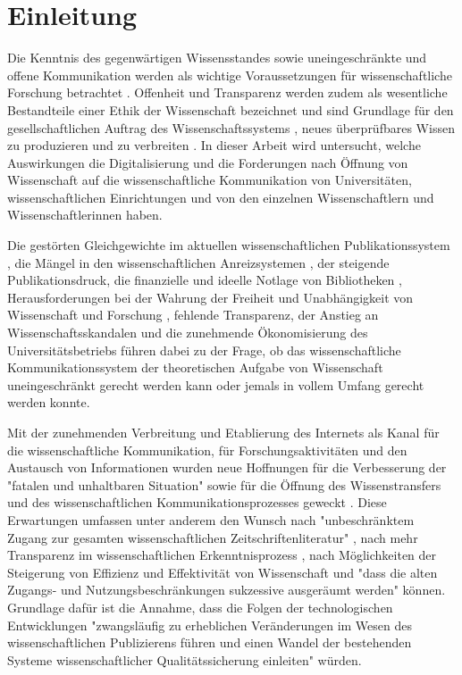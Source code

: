 \chapter{Einleitung}

Die Kenntnis des gegenwärtigen Wissensstandes sowie uneingeschränkte und offene Kommunikation werden als wichtige Voraussetzungen für wissenschaftliche Forschung betrachtet \cite{Glaeser_2006} \cite{Gibbons_1994}. Offenheit und Transparenz werden zudem als wesentliche Bestandteile einer Ethik der Wissenschaft bezeichnet \cite{Peters_2014} \cite{Resnik_2005} und sind Grundlage für den gesellschaftlichen Auftrag des Wissenschaftssystems \cite[:3]{Hanekop_2014}, neues überprüfbares Wissen zu produzieren und zu verbreiten \cite[:551]{Luescher_2014} \cite[:298]{Luhmann_1998} \cite[:100]{Graefen_2007}. In dieser Arbeit wird untersucht, welche Auswirkungen die Digitalisierung und die Forderungen nach Öffnung von Wissenschaft auf die wissenschaftliche Kommunikation von Universitäten, wissenschaftlichen Einrichtungen und von den einzelnen Wissenschaftlern und Wissenschaftlerinnen haben.

Die gestörten Gleichgewichte im aktuellen wissenschaftlichen Publikationssystem \cite{Joseph_2006}, die Mängel in den wissenschaftlichen Anreizsystemen \cite{Osterloh_2008}, der steigende Publikationsdruck, die finanzielle und ideelle Notlage von Bibliotheken \cite{Russell_2008} \cite{Sietmann_2007}, Herausforderungen bei der Wahrung der Freiheit und Unabhängigkeit von Wissenschaft und Forschung \cite{Goetting_2015}, fehlende Transparenz, der Anstieg an Wissenschaftsskandalen \cite{Brembs_2015} und die zunehmende Ökonomisierung des Universitätsbetriebs \cite{Bauer_2006} führen dabei zu der Frage, ob das wissenschaftliche Kommunikationssystem der theoretischen Aufgabe von Wissenschaft uneingeschränkt gerecht werden kann \cite{Schekman_2013} oder jemals in vollem Umfang gerecht werden konnte.

Mit der zunehmenden Verbreitung und Etablierung des Internets als Kanal für die wissenschaftliche Kommunikation, für Forschungsaktivitäten und den Austausch von Informationen wurden neue Hoffnungen für die Verbesserung der "fatalen und unhaltbaren Situation" \cite[:155]{Brembs_2015} sowie für die Öffnung des Wissenstransfers \cite{Schulze_2013} \cite{Albert_2006} und des wissenschaftlichen Kommunikationsprozesses geweckt \cite{Hanekop_2014} \cite{European_Commission_2006} \cite{Goodrum_2001} \cite{Lawrence_1999}. Diese Erwartungen umfassen unter anderem den Wunsch nach "unbeschränktem Zugang zur gesamten wissenschaftlichen Zeitschriftenliteratur" \cite{BOAI_2002}, nach mehr Transparenz im wissenschaftlichen Erkenntnisprozess \cite{European_Commission_2015a}, nach Möglichkeiten der Steigerung von Effizienz und Effektivität von Wissenschaft \cite{Partha_1994} und "dass die alten Zugangs- und Nutzungsbeschränkungen sukzessive ausgeräumt werden" \cite{BOAI_2002} können. Grundlage dafür ist die Annahme, dass die Folgen der technologischen Entwicklungen "zwangsläufig zu erheblichen Veränderungen im Wesen des wissenschaftlichen Publizierens führen und einen Wandel der bestehenden Systeme wissenschaftlicher Qualitätssicherung einleiten" \cite{Berliner_Erklaerung_2003} würden.

